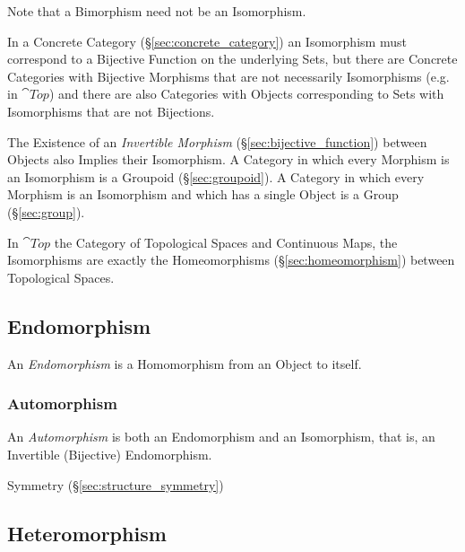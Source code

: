 \fist Note that a Bimorphism need not be an Isomorphism.

In a Concrete Category (\S\ref{sec:concrete_category}) an Isomorphism
must correspond to a Bijective Function on the underlying Sets, but
there are Concrete Categories with Bijective Morphisms that are not
necessarily Isomorphisms (e.g. in $\cat{Top}$) and there are also
Categories with Objects corresponding to Sets with Isomorphisms that
are not Bijections.

The Existence of an \emph{Invertible Morphism}
(\S\ref{sec:bijective_function}) between Objects also Implies their
Isomorphism. A Category in which every Morphism is an Isomorphism is a
Groupoid (\S\ref{sec:groupoid}). A Category in which every Morphism is
an Isomorphism and which has a single Object is a Group
(\S\ref{sec:group}).

In $\cat{Top}$ the Category of Topological Spaces and Continuous
Maps, the Isomorphisms are exactly the Homeomorphisms
(\S\ref{sec:homeomorphism}) between Topological Spaces.



\subsection{Endomorphism}\label{sec:endomorphism}

An \emph{Endomorphism} is a Homomorphism from an Object to itself.



\subsubsection{Automorphism}\label{sec:automorphism}

An \emph{Automorphism} is both an Endomorphism and an Isomorphism,
that is, an Invertible (Bijective) Endomorphism.

Symmetry (\S\ref{sec:structure_symmetry})



\subsection{Heteromorphism}\label{sec:heteromorphism}

